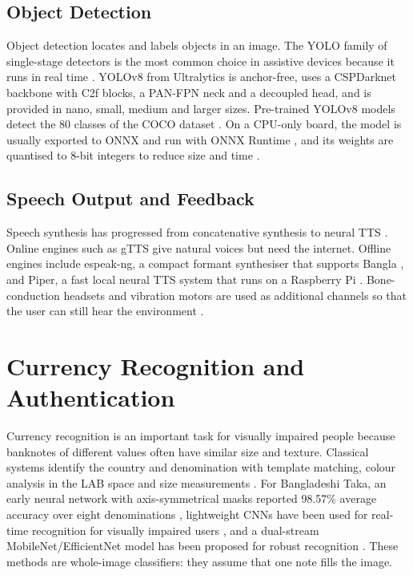 \subsection{Object Detection}
Object detection locates and labels objects in an image. The YOLO family of single-stage detectors \cite{redmon2016yolo} is the most common choice in assistive devices because it runs in real time \cite{echolight2025, aiblind2025, voicereading2025, ai_nlp2025, ivsmart2024}. YOLOv8 from Ultralytics \cite{ultralytics} is anchor-free, uses a CSPDarknet backbone with C2f blocks, a PAN-FPN neck and a decoupled head, and is provided in nano, small, medium and larger sizes. Pre-trained YOLOv8 models detect the 80 classes of the COCO dataset \cite{coco}. On a CPU-only board, the model is usually exported to ONNX and run with ONNX Runtime \cite{onnxruntime}, and its weights are quantised to 8-bit integers to reduce size and time \cite{jacob2018quantization}.

\subsection{Speech Output and Feedback}
Speech synthesis has progressed from concatenative synthesis to neural TTS \cite{stt_tts2023}. Online engines such as gTTS give natural voices but need the internet. Offline engines include espeak-ng, a compact formant synthesiser that supports Bangla \cite{espeakng}, and Piper, a fast local neural TTS system that runs on a Raspberry Pi \cite{piper}. Bone-conduction headsets and vibration motors are used as additional channels so that the user can still hear the environment \cite{googleglass2021, lightweight_glass2025}.

\section{Currency Recognition and Authentication}
\label{sec:currency_lit}

Currency recognition is an important task for visually impaired people because banknotes of different values often have similar size and texture. Classical systems identify the country and denomination with template matching, colour analysis in the LAB space and size measurements \cite{currency2017, currency2023}. For Bangladeshi Taka, an early neural network with axis-symmetrical masks reported 98.57\% average accuracy over eight denominations \cite{axissym}, lightweight CNNs have been used for real-time recognition for visually impaired users \cite{cnnrealtime}, and a dual-stream MobileNet/EfficientNet model has been proposed for robust recognition \cite{dualstream}. These methods are whole-image classifiers: they assume that one note fills the image.

